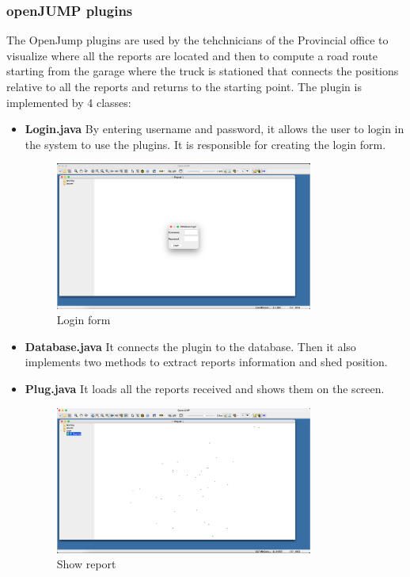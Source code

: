  \subsubsection{openJUMP plugins}
The OpenJump plugins are used by the tehchnicians of the Provincial office to visualize where all the reports are located and then to compute a road route starting from the garage where the truck is stationed that connects the positions relative to all the reports and returns to the
starting point.
The plugin is implemented by 4 classes:
\begin{itemize}
    \item\textbf{Login.java}
    By entering username and password, it allows the user to login in the system to use the plugins. It is responsible for creating the login form. 
     \begin{figure}[h]
        \centering
        \includegraphics[width=0.8\textwidth]{images/oj_login.png}
        \caption{Login form}
        \label{ER}
 \end{figure}


    \item\textbf{Database.java}
    It connects the plugin to the database. Then it also implements two methods to extract reports information and shed position.

    \item\textbf{Plug.java}
    It loads all the reports received and shows them on the screen.
    \begin{figure}[h]
        \centering
        \includegraphics[width=0.8\textwidth]{images/oj_layer.png}
        \caption{Show report}
        \label{ER}
 \end{figure}


\end{itemize}
